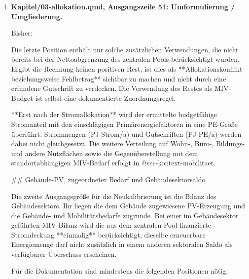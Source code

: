 \documentclass[
  ngerman,
  a4paper,
  DIV=11]{scrreprt}
\newenvironment{Shaded}{\begin{snugshade}}{\end{snugshade}}
\newcommand{\NormalTok}[1]{\textcolor[rgb]{0.00,0.23,0.31}{#1}}
\begin{document}
\begin{enumerate}
  Jetzt:

\begin{Shaded}
\begin{Highlighting}[]
\NormalTok{G\_\{\textbackslash{}mathrm\{MIV\}\}=\textbackslash{}min\textbackslash{}left(E\_\{\textbackslash{}mathrm\{MIV\}\},\textbackslash{}max(0,E\_\{\textbackslash{}mathrm\{Z\}\}{-}E\_\{\textbackslash{}mathrm\{V\}\})\textbackslash{}right).}
\end{Highlighting}
\end{Shaded}
\item
  \textbf{Kapitel/03-allokation.qmd, Ausgangszeile 51: Umformulierung /
  Umgliederung.}

  Bisher:

\begin{Shaded}
\begin{Highlighting}[]
\NormalTok{Die letzte Position enthält nur solche zusätzlichen Verwendungen, die nicht bereits bei der Nettoabgrenzung des zentralen Pools berücksichtigt wurden. Ergibt die Rechnung keinen positiven Rest, ist dies als **Allokationskonflikt beziehungsweise Fehlbetrag** sichtbar zu machen und nicht durch eine erfundene Gutschrift zu verdecken. Die Verwendung des Restes als MIV{-}Budget ist selbst eine dokumentierte Zuordnungsregel.}

\NormalTok{**Erst nach der Stromallokation** wird der ermittelte budgetfähige Stromanteil mit den einschlägigen Primärenergiefaktoren in eine PE{-}Größe überführt. Strommengen (PJ Strom/a) und Gutschriften (PJ PE/a) werden dabei nicht gleichgesetzt. Die weitere Verteilung auf Wohn{-}, Büro{-}, Bildungs{-} und andere Nutzflächen sowie die Gegenüberstellung mit dem standortabhängigen MIV{-}Bedarf erfolgt in @sec{-}kontext{-}mobilitaet.}

\NormalTok{\#\# Gebäude{-}PV, zugeordneter Bedarf und Gebäudesektorsaldo}

\NormalTok{Die zweite Ausgangsgröße für die Neukalibrierung ist die Bilanz des Gebäudesektors. Ihr liegen die dem Gebäude zugewiesene PV{-}Erzeugung und die Gebäude{-} und Mobilitätsbedarfe zugrunde. Bei einer im Gebäudesektor geführten MIV{-}Bilanz wird die aus dem zentralen Pool finanzierte Stromdeckung **einmalig** berücksichtigt; dieselbe erneuerbare Energiemenge darf nicht zusätzlich in einem anderen sektoralen Saldo als verfügbarer Überschuss erscheinen.}

\NormalTok{Für die Dokumentation sind mindestens die folgenden Positionen nötig:}


\end{Highlighting}
\end{Shaded}
\end{enumerate}
\end{document}
